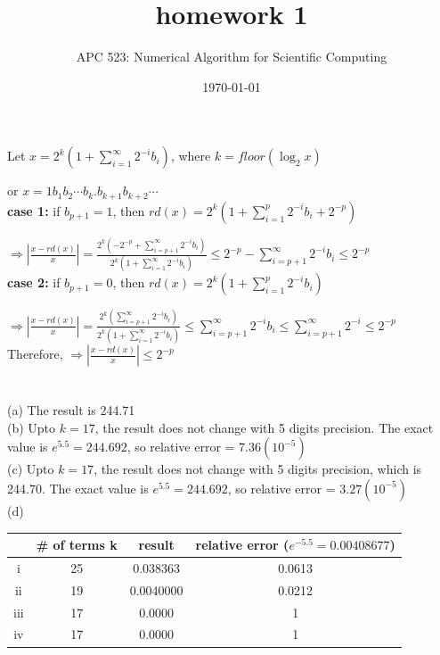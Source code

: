 \documentclass[10pt]{article}
\title{homework 1}
\date{\today}
\author{APC 523: Numerical Algorithm for Scientific Computing}
\begin{document}
\maketitle

\section{}

Let $x=2^k(1+\sum_{i=1}^{\infty}2^{-i}b_i)$, where $k=floor(\log_2x)$

or $x=1 b_1 b_2 \cdots b_k.b_{k+1} b_{k+2}\cdots $\\

\textbf{case 1:} if $b_{p+1}=1$, then $rd(x)=2^k(1+\sum_{i=1}^{p}2^{-i}b_i+2^{-p})$

$\Rightarrow|\frac{x-rd(x)}{x}|=\frac{2^k(-2^{-p}+\sum_{i=p+1}^{\infty}2^{-i}b_i)}{2^k(1+\sum_{i=1}^{\infty}2^{-i}b_i)}\leq 2^{-p}-\sum_{i=p+1}^{\infty}2^{-i}b_i\leq2^{-p}$\\

\textbf{case 2:} if $b_{p+1}=0$, then $rd(x)=2^k(1+\sum_{i=1}^{p}2^{-i}b_i)$

$\Rightarrow|\frac{x-rd(x)}{x}|=\frac{2^k(\sum_{i=p+1}^{\infty}2^{-i}b_i)}{2^k(1+\sum_{i=1}^{\infty}2^{-i}b_i)}\leq \sum_{i=p+1}^{\infty}2^{-i}b_i\leq \sum_{i=p+1}^{\infty}2^{-i}\leq2^{-p}$\\

Therefore, $\Rightarrow|\frac{x-rd(x)}{x}|\leq2^{-p}$

\section{}

(a) The result is 244.71\\

(b) Upto $k=17$, the result does not change with 5 digits precision. The exact value is $e^{5.5}=244.692$, so relative error = $7.36(10^{-5})$\\

(c) Upto $k=17$, the result does not change with 5 digits precision, which is 244.70. The exact value is $e^{5.5}=244.692$, so relative error = $3.27(10^{-5})$\\

(d) 

\begin{tabular}{cccc}
\hline
 & \# of terms k & result & relative error ($e^{-5.5}=0.00408677$)\\
 \hline
 i & 25 & 0.038363 & 0.0613\\
 ii & 19 & 0.0040000 & 0.0212\\
 iii & 17 & 0.0000 & 1\\
 iv & 17 & 0.0000 & 1\\
 \hline
\end{tabular}
\end{document}
